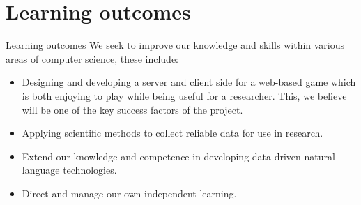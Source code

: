 \documentclass[11pt]{article}
\begin{document}
\section{Learning outcomes}
Learning outcomes
We seek to improve our knowledge and skills within various areas of computer science, these include:
\begin{itemize}
    \item Designing and developing a server and client side for a web-based game which
        is both enjoying to play while being useful for a researcher. This, we
        believe will be one of the key success factors of the project.
    \item Applying scientific methods to collect reliable data for use in
        research.
    \item Extend our knowledge and competence in developing data-driven natural
        language technologies.
    \item Direct and manage our own independent learning.
\end{itemize}



\end{document}
